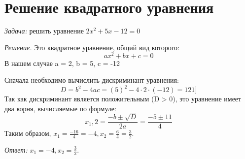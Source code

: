 \documentclass[20pt]{article}
\begin{document}
    
\section{Решение квадратного уравнения}
\textit{Задача:} решить уравнение $2x^2 + 5x - 12 = 0$ 

\hspace{20px}\textit{Решение.} Это квадратное уравнение, общий вид которого:
\[ ax^2 + bx + c = 0\]
В нашем случае a = 2, b = 5, c = -12

\hspace{20px}Сначала необходимо вычислить дискриминант уравнения:
\[D = b^2 - 4ac = (5)^2 - 4 \cdot 2 \cdot (-12) = 121]\]
Так как дискриминант является положительным (D > 0), это уравнение имеет два корня, вычисляемые по формуле:
\[x_1,2 = \frac{-b \pm \sqrt{D}}{2a} = \frac{-5 \pm 11}{4}\]
Таким образом, $x_1 = \frac{-16}{4}  = -4, x_2 = \frac{6}{4} = \frac{3}{2}.$

\hspace{20px}\textit{Ответ:} $x_1 = -4, x_2 = \frac{3}{2}.$
\end{document}
